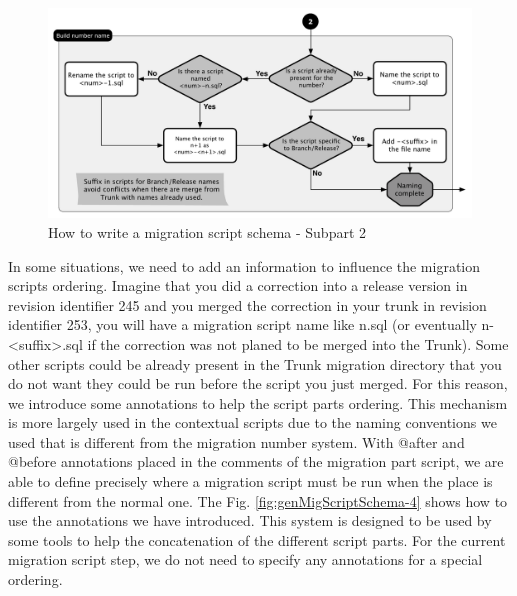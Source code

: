 \begin{figure}[h]
        \centering
        \includegraphics[scale=0.60]{images/mig-schema-gen-2.pdf}
        \caption{How to write a migration script schema - Subpart 2}
        \label{fig:genMigScriptSchema-2}
\end{figure}

In some situations, we need to add an information to influence the migration scripts ordering. Imagine that you did a correction into a release version in revision identifier 245 and you merged the correction in your trunk in revision identifier 253, you will have a migration script name like n.sql (or eventually n-<suffix>.sql if the correction was not planed to be merged into the Trunk). Some other scripts could be already present in the Trunk migration directory that you do not want they could be run before the script you just merged. For this reason, we introduce some annotations to help the script parts ordering. This mechanism is more largely used in the contextual scripts due to the naming conventions we used that is different from the migration number system. With @after and @before annotations placed in the comments of the migration part script, we are able to define precisely where a migration script must be run when the place is different from the normal one. The Fig. \ref{fig:genMigScriptSchema-4} shows how to use the annotations we have introduced. This system is designed to be used by some tools to help the concatenation of the different script parts. For the current migration script step, we do not need to specify any annotations for a special ordering.

